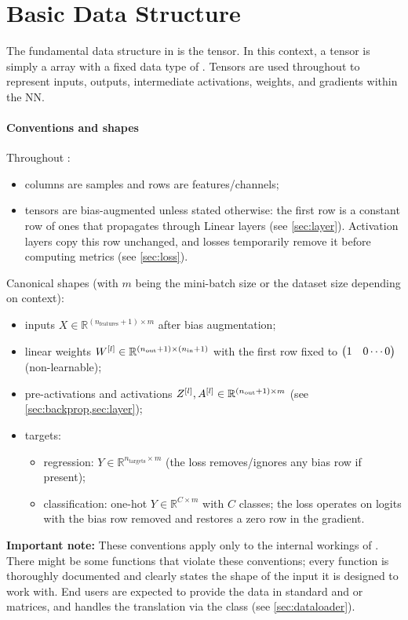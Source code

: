 \section{Basic Data Structure} \label{sec:tensor}

The fundamental data structure in \mfnet is the tensor. In this context, a tensor is simply a  array with a fixed data type of . Tensors are used throughout \mfnet to represent inputs, outputs, intermediate activations, weights, and gradients within the \acl{NN}.

\paragraph{Conventions and shapes} Throughout \mfnet:
\begin{itemize}
    \item columns are samples and rows are features/channels;
    \item tensors are bias-augmented unless stated otherwise: the first row is a constant row of ones that propagates through Linear layers (see \cref{sec:layer}). Activation layers copy this row unchanged, and losses temporarily remove it before computing metrics (see \cref{sec:loss}).
\end{itemize}

Canonical shapes (with $m$ being the mini-batch size or the dataset size depending on context):
\begin{itemize}
    \item inputs $X \in \mathbb{R}^{(n_\text{features}+1)\times m}$ after bias augmentation;
    \item linear weights $W^{[l]} \in \mathbb{R}^{(n_\text{out}+1)\times(n_\text{in}+1)}$ with the first row fixed to $\mqty(1 & 0 \cdots 0)$ (non-learnable);
    \item pre-activations and activations $Z^{[l]}, A^{[l]} \in \mathbb{R}^{(n_\text{out}+1)\times m}$ (see \cref{sec:backprop,sec:layer});
    \item targets:
    \begin{itemize}
        \item regression: $Y \in \mathbb{R}^{n_\text{targets}\times m}$ (the loss removes/ignores any bias row if present);
        \item classification: one-hot $Y \in \mathbb{R}^{C\times m}$ with $C$ classes; the loss operates on logits with the bias row removed and restores a zero row in the gradient.
    \end{itemize}
\end{itemize}

\textbf{Important note:} These conventions apply only to the internal workings of \mfnet. There might be some functions that violate these conventions; every function is thoroughly documented and clearly states the shape of the input it is designed to work with. End users are expected to provide the data in standard  and  or  matrices, and \mfnet handles the translation via the  class (see \cref{sec:dataloader}).
